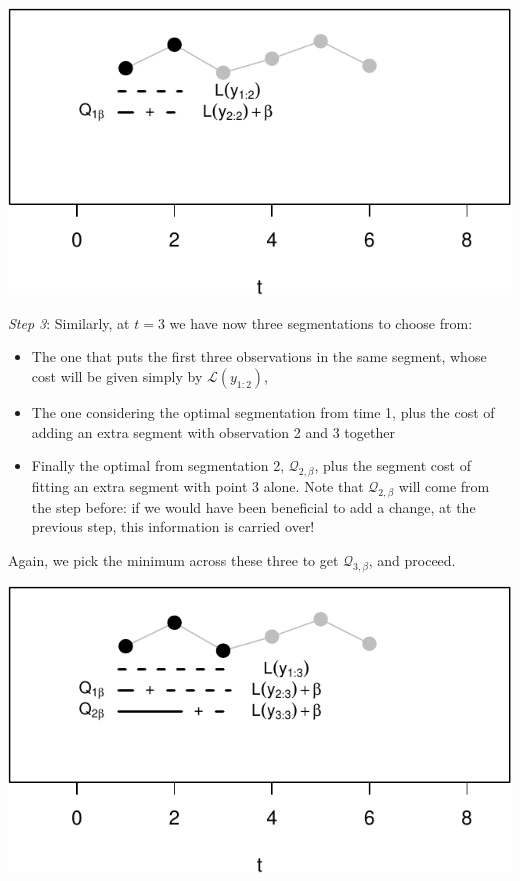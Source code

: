 \documentclass[
  letterpaper,
  DIV=11,
  numbers=noendperiod]{scrreprt}
\begin{document}
\includegraphics{3_multiple_changes_files/figure-pdf/unnamed-chunk-13-1.pdf}

\emph{Step 3}: Similarly, at \(t = 3\) we have now three segmentations
to choose from:

\begin{itemize}
\item
  The one that puts the first three observations in the same segment,
  whose cost will be given simply by \(\mathcal{L}(y_{1:2})\),
\item
  The one considering the optimal segmentation from time 1, plus the
  cost of adding an extra segment with observation 2 and 3 together
\item
  Finally the optimal from segmentation 2, \(\mathcal{Q}_{2, \beta}\),
  plus the segment cost of fitting an extra segment with point 3 alone.
  Note that \(\mathcal{Q}_{2, \beta}\) will come from the step before:
  if we would have been beneficial to add a change, at the previous
  step, this information is carried over!
\end{itemize}

Again, we pick the minimum across these three to get
\(\mathcal{Q}_{3, \beta}\), and proceed.

\includegraphics{3_multiple_changes_files/figure-pdf/unnamed-chunk-14-1.pdf}
\end{document}

